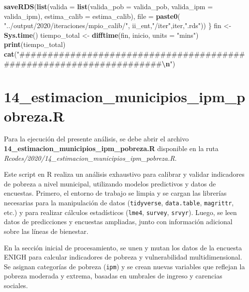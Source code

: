 \documentclass[
  12pt,
]{book}
\newenvironment{Shaded}{\begin{snugshade}}{\end{snugshade}}
\newcommand{\AttributeTok}[1]{\textcolor[rgb]{0.13,0.29,0.53}{#1}}
\newcommand{\FunctionTok}[1]{\textcolor[rgb]{0.13,0.29,0.53}{\textbf{#1}}}
\newcommand{\NormalTok}[1]{#1}
\newcommand{\OtherTok}[1]{\textcolor[rgb]{0.56,0.35,0.01}{#1}}
\newcommand{\SpecialCharTok}[1]{\textcolor[rgb]{0.81,0.36,0.00}{\textbf{#1}}}
\newcommand{\StringTok}[1]{\textcolor[rgb]{0.31,0.60,0.02}{#1}}
\begin{document}
\begin{Shaded}
\begin{Highlighting}[]
  \FunctionTok{saveRDS}\NormalTok{(}\FunctionTok{list}\NormalTok{(}\AttributeTok{valida =} \FunctionTok{list}\NormalTok{(}\AttributeTok{valida\_pob =}\NormalTok{ valida\_pob, }
                             \AttributeTok{valida\_ipm =}\NormalTok{ valida\_ipm),}
               \AttributeTok{estima\_calib =}\NormalTok{ estima\_calib),}
          \AttributeTok{file =} \FunctionTok{paste0}\NormalTok{( }\StringTok{"../output/2020/iteraciones/mpio\_calib/"}\NormalTok{,}
\NormalTok{                         ii\_ent,}\StringTok{"/iter"}\NormalTok{,iter,}\StringTok{".rds"}\NormalTok{))}
\NormalTok{\}}
\NormalTok{fin }\OtherTok{\textless{}{-}} \FunctionTok{Sys.time}\NormalTok{()}
\NormalTok{tiempo\_total }\OtherTok{\textless{}{-}} \FunctionTok{difftime}\NormalTok{(fin, inicio, }\AttributeTok{units =} \StringTok{"mins"}\NormalTok{)}
\FunctionTok{print}\NormalTok{(tiempo\_total)}
\FunctionTok{cat}\NormalTok{(}\StringTok{"\#\#\#\#\#\#\#\#\#\#\#\#\#\#\#\#\#\#\#\#\#\#\#\#\#\#\#\#\#\#\#\#\#\#\#\#\#\#\#\#\#\#\#\#\#\#\#\#\#\#\#\#\#\#\#\#\#\#\#\#\#\#\#\#\#\#\#\#}\SpecialCharTok{\textbackslash{}n}\StringTok{"}\NormalTok{)}
\end{Highlighting}
\end{Shaded}

\hypertarget{estimacion_municipios_ipm_pobreza.r}{%
\chapter*{14\_estimacion\_municipios\_ipm\_pobreza.R}\label{estimacion_municipios_ipm_pobreza.r}}

Para la ejecución del presente análisis, se debe abrir el archivo \textbf{14\_estimacion\_municipios\_ipm\_pobreza.R} disponible en la ruta \emph{Rcodes/2020/14\_estimacion\_municipios\_ipm\_pobreza.R}.

Este script en R realiza un análisis exhaustivo para calibrar y validar indicadores de pobreza a nivel municipal, utilizando modelos predictivos y datos de encuestas. Primero, el entorno de trabajo se limpia y se cargan las librerías necesarias para la manipulación de datos (\texttt{tidyverse}, \texttt{data.table}, \texttt{magrittr}, etc.) y para realizar cálculos estadísticos (\texttt{lme4}, \texttt{survey}, \texttt{srvyr}). Luego, se leen datos de predicciones y encuestas ampliadas, junto con información adicional sobre las líneas de bienestar.

En la sección inicial de procesamiento, se unen y mutan los datos de la encuesta ENIGH para calcular indicadores de pobreza y vulnerabilidad multidimensional. Se asignan categorías de pobreza (\texttt{ipm}) y se crean nuevas variables que reflejan la pobreza moderada y extrema, basadas en umbrales de ingreso y carencias sociales.
\end{document}
